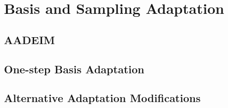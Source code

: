 \section{Basis and Sampling Adaptation}

\subsection{AADEIM}

\subsection{One-step Basis Adaptation}

\subsection{Alternative Adaptation Modifications}